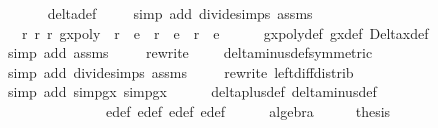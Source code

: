 \begin{isabellebody}
\ \ \ \ \isamarkupfalse%
\ delta{\isacharunderscore}def\isanewline
\ \ \ \ \isamarkupfalse%
{\isacharparenleft}simp\ add{\isacharcolon}\ divide{\isacharunderscore}simps\ assms{\isacharparenleft}{}{\isacharminus}{}{\isacharparenright}{\isacharparenright}\isanewline
\ \ \isanewline
\ \ \isamarkupfalse%
\ {\isachardoublequoteopen}{\isasymexists}\ r{}\ r{}\ r{}{\isachardot}\ gxpoly\ {\isacharequal}\ r{}\ {\isacharasterisk}\ e{}\ {\isacharplus}\ r{}\ {\isacharasterisk}\ e{}\ {\isacharplus}\ r{}\ {\isacharasterisk}\ e{}{\isachardoublequoteclose}\isanewline
\ \ \ \ \isamarkupfalse%
\ gxpoly{\isacharunderscore}def\ g\isactrlsub x{\isacharunderscore}def\ Delta\isactrlsub x{\isacharunderscore}def\ \isanewline
\ \ \ \ \isamarkupfalse%
{\isacharparenleft}simp\ add{\isacharcolon}\ assms{\isacharparenleft}{}{\isacharcomma}{}{\isacharparenright}{\isacharparenright}\isanewline
\ \ \ \ \isamarkupfalse%
{\isacharparenleft}rewrite\ \ {\isachardoublequoteopen}{\isacharunderscore}\ {\isacharslash}\ {\isasymhole}{\isachardoublequoteclose}\ delta{\isacharunderscore}minus{\isacharunderscore}def{\isacharbrackleft}symmetric{\isacharbrackright}{\isacharparenright}{\isacharplus}\isanewline
\ \ \ \ \isamarkupfalse%
{\isacharparenleft}simp\ add{\isacharcolon}\ divide{\isacharunderscore}simps\ assms{\isacharparenleft}{}{\isacharcomma}{}{}{\isacharparenright}{\isacharparenright}\isanewline
\ \ \ \ \isamarkupfalse%
{\isacharparenleft}rewrite\ left{\isacharunderscore}diff{\isacharunderscore}distrib{\isacharparenright}\isanewline
\ \ \ \ \isamarkupfalse%
{\isacharparenleft}simp\ add{\isacharcolon}\ simp{}gx\ simp{}gx{\isacharparenright}\isanewline
\ \ \ \ \isamarkupfalse%
\ delta{\isacharunderscore}plus{\isacharunderscore}def\ delta{\isacharunderscore}minus{\isacharunderscore}def\isanewline
\ \ \ \ \ \ \ \ \ \ \ \ \ \ e{}{\isacharunderscore}def\ e{}{\isacharunderscore}def\ e{}{\isacharunderscore}def\ e{\isacharunderscore}def\isanewline
\ \ \ \ \isamarkupfalse%
\ algebra\isanewline
\isanewline
\ \ \isamarkupfalse%
\ \isamarkupfalse%
\ {\isacharquery}thesis\isanewline
\ \ \ \ \isamarkupfalse%

\end{isabellebody}
